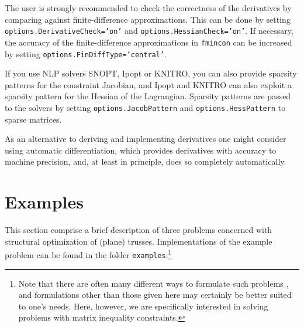 \documentclass{article}
\begin{document}
The user is strongly recommended to check the correctness of the derivatives by comparing against finite-difference 
approximations. This can be done by setting \texttt{options.DerivativeCheck='on'} and \texttt{options.HessianCheck='on'}. 
If necessary, the accuracy of the finite-difference approximations in \texttt{fmincon} can be increased by setting
\texttt{options.FinDiffType='central'}.

If you use NLP solvers SNOPT, Ipopt or KNITRO, you can also provide sparsity patterns for the constraint Jacobian, and Ipopt
and KNITRO can also exploit a sparsity pattern for the Hessian of the Lagrangian. Sparsity patterns are passed to the solvers
by setting \texttt{options.JacobPattern} and \texttt{options.HessPattern} to sparse matrices.

As an alternative to deriving and implementing derivatives one might consider using automatic differentiation, which provides 
derivatives with accuracy to machine precision, and, at least in principle, does so completely automatically.

   


\section{Examples}

This section comprise a brief description of three problems concerned with structural optimization of (plane) trusses. Implementations of the example problem can be found in the folder \texttt{examples}.\footnote{Note that there are often many different ways to formulate such problems \cite{Cristensen:2009,Bendsoe:1994}, and formulations other than those given here may certainly be better suited to one's needs. Here, however, we are specifically interested in solving problems with matrix inequality constraints.}
\end{document}
